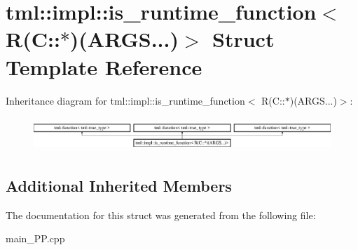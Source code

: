 \hypertarget{structtml_1_1impl_1_1is__runtime__function_3_01R_07C_1_1_5_08_07ARGS_8_8_8_08_4}{\section{tml\+:\+:impl\+:\+:is\+\_\+runtime\+\_\+function$<$ R(C\+:\+:$\ast$)(A\+R\+G\+S...)$>$ Struct Template Reference}
\label{structtml_1_1impl_1_1is__runtime__function_3_01R_07C_1_1_5_08_07ARGS_8_8_8_08_4}
}
Inheritance diagram for tml\+:\+:impl\+:\+:is\+\_\+runtime\+\_\+function$<$ R(C\+:\+:$\ast$)(A\+R\+G\+S...)$>$\+:\begin{figure}[H]
\begin{center}
\leavevmode
\includegraphics[height=1.291811cm]{structtml_1_1impl_1_1is__runtime__function_3_01R_07C_1_1_5_08_07ARGS_8_8_8_08_4}
\end{center}
\end{figure}
\subsection*{Additional Inherited Members}


The documentation for this struct was generated from the following file\+:\begin{DoxyCompactItemize}
\item 
main\+\_\+\+P\+P.\+cpp\end{DoxyCompactItemize}
